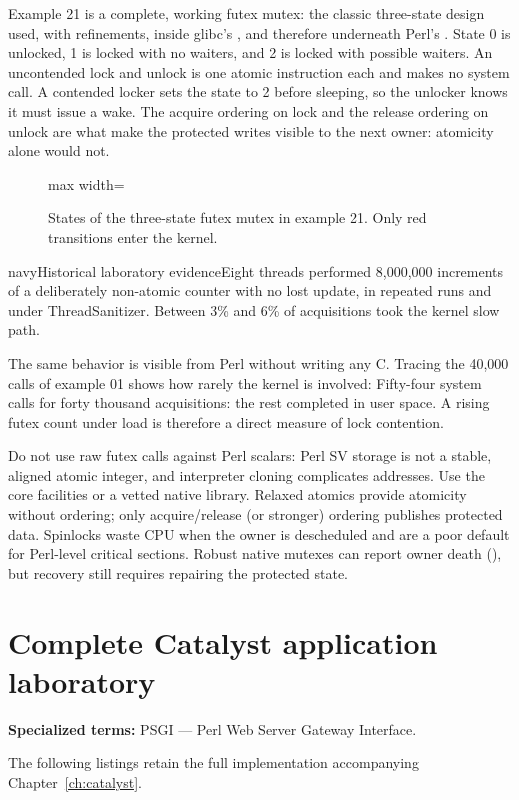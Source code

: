 \documentclass[11pt,openany]{book}
\makeatletter
\newcommand{\fig}[2]{\begin{figure}[!htbp]\centering\begin{adjustbox}{max width=\linewidth}\end{adjustbox}\caption{#2}\label{fig:#1}\end{figure}}
\DeclareRobustCommand{\code}[1]{\texttt{\expandafter\code@quotes\expandafter{\detokenize{#1}}}}
\newcommand{\code@quotes}[1]{\saveexpandmode\expandarg
  \StrSubstitute{#1}{'}{\noexpand\textquotesingle}[\code@tmp]%
  \StrSubstitute{\code@tmp}{`}{\noexpand\textasciigrave}[\code@tmp]%
  \StrSubstitute{\code@tmp}{::}{::\noexpand\allowbreak}[\code@tmp]%
  \restoreexpandmode\code@tmp}
\newcommand{\tested}[1]{\begin{callout}{navy}{Historical laboratory evidence}#1\end{callout}}
\makeatother
\begin{document}
Example 21 is a complete, working futex mutex: the classic three-state design used, with refinements, inside glibc's \code{pthread_mutex_t}, and therefore underneath Perl's \code{lock}. State 0 is unlocked, 1 is locked with no waiters, and 2 is locked with possible waiters. An uncontended lock and unlock is one atomic instruction each and makes no system call. A contended locker sets the state to 2 before sleeping, so the unlocker knows it must issue a wake. The acquire ordering on lock and the release ordering on unlock are what make the protected writes visible to the next owner: atomicity alone would not.
\fig{futexstates}{States of the three-state futex mutex in example 21. Only red transitions enter the kernel.}
\tested{Eight threads performed 8{,}000{,}000 increments of a deliberately non-atomic counter with no lost update, in repeated runs and under ThreadSanitizer. Between 3\% and 6\% of acquisitions took the kernel slow path.}
The same behavior is visible from Perl without writing any C. Tracing the 40{,}000 \code{lock} calls of example 01 shows how rarely the kernel is involved:
Fifty-four system calls for forty thousand acquisitions: the rest completed in user space. A rising futex count under load is therefore a direct measure of lock contention.

Do not use raw futex calls against Perl scalars: Perl SV storage is not a stable, aligned atomic integer, and interpreter cloning complicates addresses. Use the core facilities or a vetted native library. Relaxed atomics provide atomicity without ordering; only acquire/release (or stronger) ordering publishes protected data. Spinlocks waste CPU when the owner is descheduled and are a poor default for Perl-level critical sections. Robust native mutexes can report owner death (\code{EOWNERDEAD}), but recovery still requires repairing the protected state.


\chapter{Complete Catalyst application laboratory}\label{app:catalyst}

\par\smallskip\noindent\textbf{Specialized terms:} PSGI --- Perl Web Server Gateway Interface.\par\smallskip
The following listings retain the full implementation accompanying Chapter~\ref{ch:catalyst}.
\end{document}

